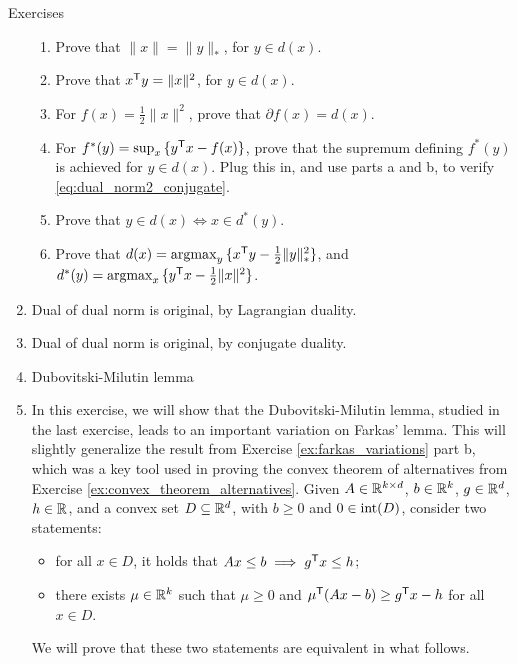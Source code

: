 \begin{xcb}{Exercises}
\begin{enumerate}[label=\thechapter.\arabic*]
\begin{enumerate}[label=\alph*.] 
\item Prove that $\|x\| = \|y\|_*$, for $y \in d(x)$.
\item Prove that $x^{\mathsf{T}} y = \|x\|^2$, for $y \in d(x)$. 
\item For $f(x) = \frac{1}{2} \|x\|^2$, prove that $\partial f(x) = d(x)$. 
\item For $f^*(y) = \sup_x \, \{ y^{\mathsf{T}} x - f(x) \}$, prove that the supremum
  defining $f^*(y)$ is achieved for $y \in d(x)$. Plug this in, and use parts a
  and b, to verify \eqref{eq:dual_norm2_conjugate}. 
\item Prove that $y \in d(x) \iff x \in d^*(y)$.
\item Prove that $d(x) = \operatorname*{argmax}_y \, \{ x^{\mathsf{T}} y - \frac{1}{2} \|y\|_*^2 \}$, and 
  $d^*(y) = \operatorname*{argmax}_x \, \{ y^{\mathsf{T}} x - \frac{1}{2} \|x\|^2 \}$. 
\end{enumerate}


\item \label{ex:dual_norm_dual2}
Dual of dual norm is original, by Lagrangian duality.

\item \label{ex:dual_norm_dual3}
Dual of dual norm is original, by conjugate duality.

\item \label{ex:dubovitski_milutin}
Dubovitski-Milutin lemma

\item \label{ex:farkas_variations_conic} 
  In this exercise, we will show that the Dubovitski-Milutin lemma, studied in
  the last exercise, leads to an important variation on Farkas' lemma. This will 
  slightly generalize the result from Exercise \ref{ex:farkas_variations} part
  b, which was a key tool used in proving the convex theorem of alternatives
  from Exercise \ref{ex:convex_theorem_alternatives}. Given $A \in \mathbb{R}^{k \times
    d}$, $b \in \mathbb{R}^k$, $g \in \mathbb{R}^d$, $h \in \mathbb{R}$, and a convex set $D \subseteq
  \mathbb{R}^d$, with $b \geq 0$ and $0 \in \operatorname{int}(D)$, consider two statements:       
  \begin{itemize}
  \item for all $x \in D$, it holds that $Ax \leq b \implies g^{\mathsf{T}} x \leq h$;  
  \item there exists $\mu \in \mathbb{R}^k$ such that $\mu \geq 0$ and $\mu^{\mathsf{T}} (Ax - b) 
    \geq g^{\mathsf{T}} x - h$ for all $x \in D$.
  \end{itemize}
  We will prove that these two statements are equivalent in what follows.


\end{enumerate}
\end{xcb}
